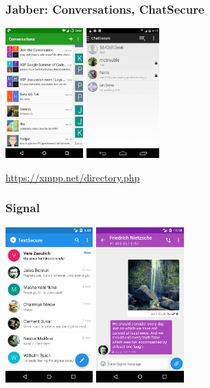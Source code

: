 \documentclass[12pt, xcolor={svgnames,table}]{beamer}
\begin{document}
\begin{frame}
  \frametitle{Jabber: Conversations, ChatSecure}
    \begin{center}
      \includegraphics[height=5cm]{img/conversations.png}
      \hspace{0.5cm}
      \includegraphics[height=5cm]{img/chatsecure.png}
    \end{center}
    \url{https://xmpp.net/directory.php}
\end{frame}

\begin{frame}
  \frametitle{Signal}
    \begin{center}
      \includegraphics[height=6cm]{img/signal1.png}
      \hspace{0.5cm}
      \includegraphics[height=6cm]{img/signal2.png}
    \end{center}
\end{frame}
\end{document}
